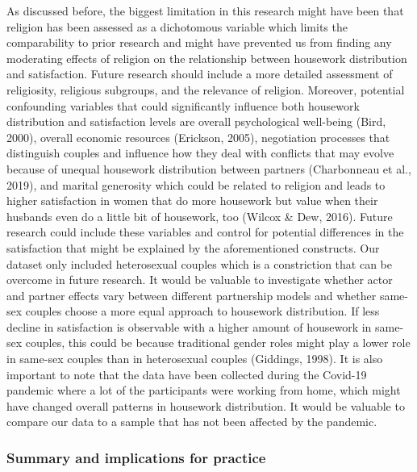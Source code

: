 \documentclass[
  man,floatsintext]{apa6}
\begin{document}
As discussed before, the biggest limitation in this research might have been that religion has been assessed as a dichotomous variable which limits the comparability to prior research and might have prevented us from finding any moderating effects of religion on the relationship between housework distribution and satisfaction. Future research should include a more detailed assessment of religiosity, religious subgroups, and the relevance of religion.
Moreover, potential confounding variables that could significantly influence both housework distribution and satisfaction levels are overall psychological well-being (Bird, 2000), overall economic resources (Erickson, 2005), negotiation processes that distinguish couples and influence how they deal with conflicts that may evolve because of unequal housework distribution between partners (Charbonneau et al., 2019), and marital generosity which could be related to religion and leads to higher satisfaction in women that do more housework but value when their husbands even do a little bit of housework, too (Wilcox \& Dew, 2016). Future research could include these variables and control for potential differences in the satisfaction that might be explained by the aforementioned constructs.
Our dataset only included heterosexual couples which is a constriction that can be overcome in future research. It would be valuable to investigate whether actor and partner effects vary between different partnership models and whether same-sex couples choose a more equal approach to housework distribution. If less decline in satisfaction is observable with a higher amount of housework in same-sex couples, this could be because traditional gender roles might play a lower role in same-sex couples than in heterosexual couples (Giddings, 1998).
It is also important to note that the data have been collected during the Covid-19 pandemic where a lot of the participants were working from home, which might have changed overall patterns in housework distribution. It would be valuable to compare our data to a sample that has not been affected by the pandemic.

\hypertarget{summary-and-implications-for-practice}{%
\subsubsection{Summary and implications for practice}\label{summary-and-implications-for-practice}}
\end{document}

